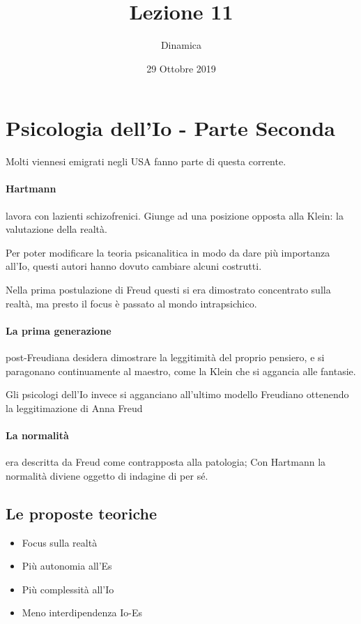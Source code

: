 \documentclass[12pt, a4paper]{article}
\date{29 Ottobre 2019}
\title{Lezione 11}
\author{Dinamica}
\begin{document}
\maketitle

\section{Psicologia dell'Io - Parte Seconda}

Molti viennesi emigrati negli USA fanno parte di questa corrente.

\paragraph{Hartmann} lavora con lazienti schizofrenici. Giunge ad una posizione opposta alla Klein: la valutazione della realt\`a.

Per poter modificare la teoria psicanalitica in modo da dare pi\`u importanza all'Io, questi autori hanno dovuto cambiare alcuni costrutti.

Nella prima postulazione di Freud questi si era dimostrato concentrato sulla realt\`a, ma presto il focus \`e passato al mondo intrapsichico.

\paragraph{La prima generazione} post-Freudiana desidera dimostrare la leggitimit\`a del proprio pensiero, e si paragonano continuamente al maestro, come la Klein che si aggancia alle fantasie.

Gli psicologi dell'Io invece si agganciano all'ultimo modello Freudiano ottenendo la leggitimazione di Anna Freud

\paragraph{La normalit\`a} era descritta da Freud come contrapposta alla patologia; Con Hartmann la normalit\`a diviene oggetto di indagine di per s\'e.

\subsection{Le proposte teoriche}

\begin{itemize}
    \item Focus sulla realt\`a
    \item Pi\`u autonomia all'Es
    \item Pi\`u complessit\`a all'Io
    \item Meno interdipendenza Io-Es
\end{itemize}
\end{document}
